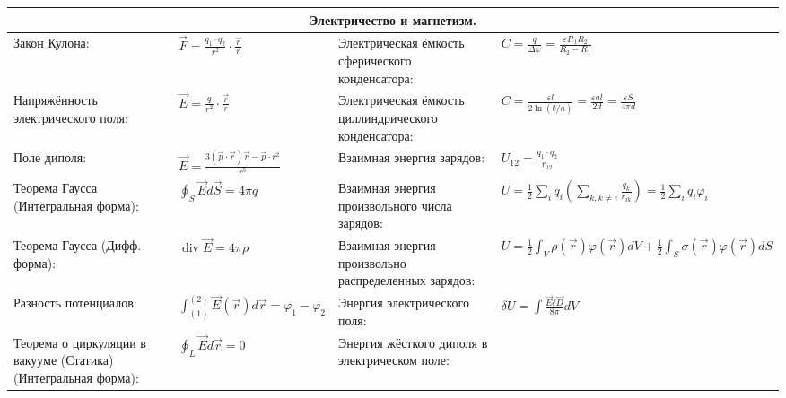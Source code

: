 \documentclass{article}
\begin{document}
\begin{tabular}{ |p{6cm}|p{3.5cm}|p{6cm}|p{3.5cm}|  }
\hline
\multicolumn{4}{|c|}{Электричество и магнетизм.} \\
\hline
Закон Кулона:                                                              &
$\vec F = \frac{q_1 \cdot q_2}{r^2} \cdot \frac{\vec r}{r}$                &
Электрическая ёмкость сферического конденсатора:                           &
$C=\frac{q}{\Delta \varphi}=\frac{\varepsilon R_{1} R_{2}}{R_{2}-R_{1}}$   \\
\hline
Напряжённость электрического поля:                                         &
$\vec E = \frac{q}{r^2} \cdot \frac{\vec r}{r}$                            &
Электрическая ёмкость циллиндрического конденсатора:                       &
$C=\frac{\varepsilon l}{2 \ln (b / a)}=\frac{\varepsilon a l}{2 d}=\frac{\varepsilon S}{4 \pi d}$\\
\hline
Поле диполя:                                                               &
$\vec E = \frac{3(\vec p \cdot \vec r) \vec r- \vec p \cdot r^{2}}{r^{5}}$ &
Взаимная энергия зарядов:                                                  &
$U_{12}=\frac {q_{1} \cdot q_{2}}{r_{12}}$                                 \\
\hline
Теорема Гаусса (Интегральная форма):                                       &
$\oint_{S} {\vec E} d {\vec S} = 4 \pi q$                                  &
Взаимная энергия произвольного числа зарядов:                              &
$U=\frac{1}{2} \sum_{i} q_{i}\left(\sum_{k, k \neq i} \frac{q_{k}}{r_{i k}}\right)=\frac{1}{2} \sum_{i} q_{i} \varphi_{i}$ \\
\hline
Теорема Гаусса (Дифф. форма):                                              &
$\operatorname{div} {\vec E} = 4 \pi \rho$                                 &
Взаимная энергия произвольно распределенных зарядов:                       &
$U=\frac{1}{2} \int_{V} \rho(\vec{r}) \varphi(\vec{r}) d V+\frac{1}{2} \int_{S} \sigma(\vec{r}) \varphi(\vec{r}) d S$ \\
\hline
Разность потенциалов:                                                      &
$\int_{(1)}^{(2)} {\vec E}({\vec r}) d {\vec r}=\varphi_{1}-\varphi_{2}$   &
Энергия электрического поля:                                               &
$\delta U=\int \frac{\vec{E} \delta \vec{D}}{8 \pi} d V$ \\
\hline
Теорема о циркуляции в вакууме (Статика) (Интегральная форма):             &
$\oint_{L} {\vec E} d {\vec r} = 0$                                        &
Энергия жёсткого диполя в электрическом поле:                              &

\end{tabular}
\end{document}
